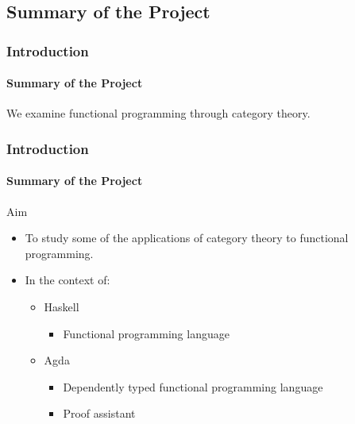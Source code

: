 \documentclass{beamer}
\begin{document}

\subsection[Summary]{Summary of the Project}


\begin{frame}
  \frametitle{Introduction}
  \framesubtitle{Summary of the Project}

  We examine functional programming through category theory.

\end{frame}


\begin{frame}[label={aim}]
  \frametitle{Introduction}
  \framesubtitle{Summary of the Project}

  \begin{block}{Aim}
    \begin{itemize}
    \item
      To study some of the applications of category theory to
      functional programming.
    \item
      In the context of:
      \begin{itemize}
      \item
        Haskell
        \begin{itemize}
        \item
          Functional programming language
        \end{itemize}
      \item
        Agda
        \begin{itemize}
        \item
          Dependently typed functional programming language
        \item
          Proof assistant
        \end{itemize}
      \end{itemize}
    \end{itemize}
  \end{block}

\end{frame}
\end{document}
